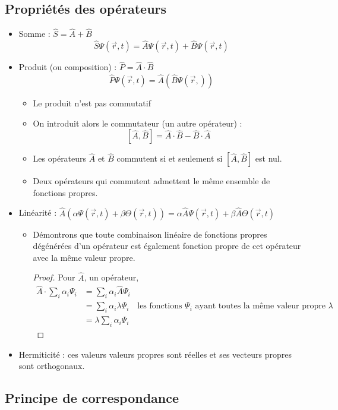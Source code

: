 \documentclass[../main.tex]{subfile}
\begin{document}
\subsection{Propriétés des opérateurs}
\begin{itemize}
	\item Somme : $\hat{S} = \hat{A} + \hat{B}$
	$$\hat{S}\Psi(\vec{r}, t) = \hat{A} \Psi(\vec{r}, t) + \hat{B} \Psi(\vec{r}, t)$$
	\item Produit (ou composition) : $\hat{P} = \hat{A} \cdot \hat{B}$
	$$\hat{P}\Psi(\vec{r}, t) = \hat{A}(\hat{B} \Psi(\vec{r}, ))$$
	\begin{itemize}
		\item Le produit n'est pas commutatif
		\item On introduit alors le commutateur (un autre opérateur) : 
		$$[\hat{A}, \hat{B}] = \hat{A} \cdot \hat{B} - \hat{B} \cdot \hat{A}$$
		\item Les opérateurs $\hat{A}$ et $\hat{B}$ commutent si et seulement si $[\hat{A}, \hat{B}]$ est nul.
		\item Deux opérateurs qui commutent admettent le même ensemble de fonctions propres.
	\end{itemize}
	\item Linéarité : $\hat{A}(\alpha \Psi(\vec{r}, t) + \beta \Theta(\vec{r}, t)) = \alpha \hat{A} \Psi (\vec{r}, t) + \beta \hat{A} \Theta(\vec{r}, t)$
	\begin{itemize}
		\item Démontrons que toute combinaison linéaire de fonctions propres dégénérées d'un opérateur est également fonction propre de cet opérateur avec la même valeur propre.
		\begin{proof}
			Pour $\hat{A}$, un opérateur,
			$$
			\begin{aligned}
				\hat{A} \cdot \sum\limits_{i} \alpha_i \Psi_i &= \sum\limits_i \alpha_i \hat{A} \Psi_i\\
				&= \sum\limits_i \alpha_i \lambda \Psi_i \ \ \ \text{ les fonctions $\Psi_i$ ayant toutes la même valeur propre $\lambda$}\\
				&= \lambda \sum\limits_i \alpha_i \Psi_i
			\end{aligned}
			$$
		\end{proof}
	\end{itemize}
	\item Hermiticité : ces valeurs valeurs propres sont réelles et ses vecteurs propres sont orthogonaux.
\end{itemize}
\subsection{Principe de correspondance}
\end{document}
